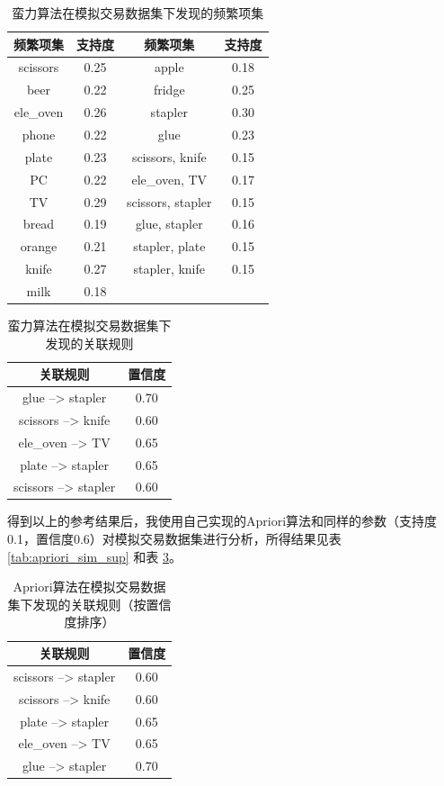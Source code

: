 \documentclass[12pt,a4paper]{article}
\theoremstyle{definition}
\begin{document}
\begin{table}[H]
	\renewcommand\arraystretch{1.35}
	\caption{蛮力算法在模拟交易数据集下发现的频繁项集}
	\label{tab:baoli_sim_sup}
	\centering
	
	\begin{tabular}{c|c|c|c}
		\centering
		频繁项集 & 支持度 & 频繁项集 & 支持度 \\
		\hline
		scissors & 0.25 & apple & 0.18 \\
		beer & 0.22 & fridge & 0.25 \\
		ele\_oven & 0.26 & stapler & 0.30 \\
		phone & 0.22 & glue & 0.23 \\
		plate & 0.23 & scissors, knife & 0.15 \\
		PC & 0.22 & ele\_oven, TV & 0.17 \\
		TV & 0.29 & scissors, stapler & 0.15 \\
		bread & 0.19 & glue, stapler & 0.16 \\
		orange & 0.21 & stapler, plate & 0.15 \\
		knife & 0.27 & stapler, knife & 0.15 \\
		milk & 0.18 & & \\		
	\end{tabular}
\end{table}

\begin{table}[H]
	\renewcommand\arraystretch{1.35}
	\caption{蛮力算法在模拟交易数据集下发现的关联规则}
	\label{tab:baoli_sim_con}
	\centering
	
	\begin{tabular}{c|c}
		\centering
		关联规则 & 置信度 \\
		\hline
		glue --> stapler & 0.70 \\
		scissors --> knife & 0.60 \\
		ele\_oven --> TV & 0.65 \\
		plate --> stapler & 0.65 \\
		scissors --> stapler & 0.60 \\
	\end{tabular}
\end{table}

得到以上的参考结果后，我使用自己实现的Apriori算法和同样的参数（支持度0.1，置信度0.6）对模拟交易数据集进行分析，所得结果见表 \ref{tab:apriori_sim_sup} 和表 \ref{tab:apriori_sim_con}。

\begin{table}[H]
	\renewcommand\arraystretch{1.35}
	\caption{Apriori算法在模拟交易数据集下发现的关联规则（按置信度排序）}
	\label{tab:apriori_sim_con}
	\centering
	
	\begin{tabular}{c|c}
		\centering
		关联规则 & 置信度 \\
		\hline
		scissors --> stapler & 0.60 \\
		scissors --> knife & 0.60 \\
		plate --> stapler & 0.65 \\
		ele\_oven --> TV & 0.65 \\
		glue --> stapler & 0.70 \\
	\end{tabular}
\end{table}
\end{document}
